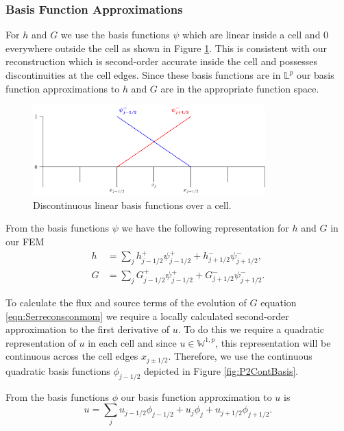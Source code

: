 \subsubsection{Basis Function Approximations}
For $h$ and $G$ we use the basis functions $\psi$ which are linear inside a cell and $0$ everywhere outside the cell as shown in Figure \ref{fig:P1DiscBasis}. This is consistent with our reconstruction which is second-order accurate inside the cell and possesses discontinuities at the cell edges. Since these basis functions are in $\mathbb{L}^p$ our basis function approximations to $h$ and $G$ are in the appropriate function space.

\begin{figure}
	\centering
	\includegraphics[width=0.8\textwidth]{./chp3/figures/P1.pdf}
	\caption{Discontinuous linear basis functions over a cell.}
	\label{fig:P1DiscBasis}
\end{figure}
From the basis functions $\psi$ we have the following representation for $h$ and $G$ in our FEM
\begin{subequations}
\begin{align}
\label{eqn:FEapproxtoh}
h &= \sum_j h^+_{j-1/2}\psi^+_{j-1/2}  + h^-_{j+1/2}\psi^-_{j+1/2}, \\
G &= \sum_j G^+_{j-1/2}\psi^+_{j-1/2}  + G^-_{j+1/2}\psi^-_{j+1/2}.
\label{eqn:FEapproxtoG}
\end{align}
\label{eqn:FEapproxtohG}
\end{subequations}


To calculate the flux and source terms of the evolution of $G$ equation \eqref{eqn:Serreconsconmom} we require a locally  calculated second-order approximation to the first derivative of $u$. To do this we require a quadratic representation of $u$ in each cell and since $u\in\mathbb{W}^{1,p}$, this representation will be continuous across the cell edges $x_{j \pm 1/2}$. Therefore, we use the continuous quadratic basis functions $\phi_{j-1/2} $ depicted in Figure \ref{fig:P2ContBasis}.

From the basis functions $\phi$ our basis function approximation to $u$ is
\begin{equation}
u = \sum_j u_{j-1/2}\phi_{j-1/2} + u_{j}\phi_{j} + u_{j+1/2}\phi_{j+1/2}.
\label{eqn:FEapproxtou}
\end{equation}

